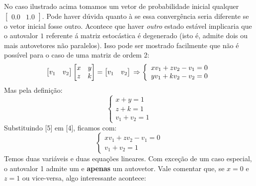 \documentclass[12pt]{article}
\begin{document}
No caso ilustrado acima tomamos um vetor de probabilidade inicial qualquer $\begin{bmatrix} 0.0 & 1.0 \end{bmatrix}$. Pode haver dúvida quanto à se essa convergência seria diferente se o vetor inicial fosse outro. Acontece que haver \textit{outro} estado estável implicaria que o autovalor $1$ referente á matriz estocástica é degenerado (isto é, admite dois ou mais autovetores não paralelos). Isso pode ser mostrado facilmente que não é possível para o caso de uma matriz de ordem 2:
\begin{equation}
\begin{bmatrix} v_1 & v_2 \end{bmatrix}
\begin{bmatrix}
x & y\\
z & k
\end{bmatrix}
=
\begin{bmatrix} v_1 & v_2 \end{bmatrix}\\
\Rightarrow 
\left\{
\begin{array}{ll}
xv_1 + zv_2 - v_1 = 0\\
yv_1 + kv_2 - v_2 = 0\\
\end{array}\right.
\end{equation}
Mas pela definição:
\begin{equation}
\left\{
\begin{array}{ll}
x + y = 1\\
z + k = 1\\
v_1 + v_2 = 1
\end{array}\right.
\end{equation}
Substituindo [5] em [4], ficamos com:
\begin{equation}
\left\{
\begin{array}{ll}
xv_1 + zv_2 - v_1 = 0\\
v_1 + v_2 = 1
\end{array}\right.
\end{equation}
Temos duas variáveis e duas equações lineares. Com exceção de um caso especial, o autovalor 1 admite um e \textbf{apenas} um autovetor. Vale comentar que, se $x = 0$ e $z = 1$ ou vice-versa, algo interessante acontece:
\end{document}
